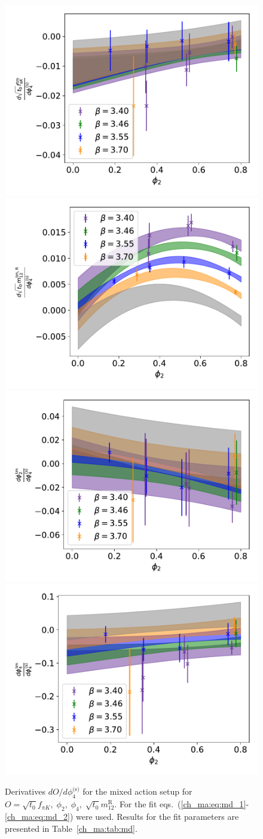 \begin{figure}
    \centering
    \includegraphics[width=.49\textwidth]{./cap4/figs/dt0fpik_tm.pdf}
    \includegraphics[width=.49\textwidth]{./cap4/figs/dt0m12_tm.pdf}
    \includegraphics[width=.49\textwidth]{./cap4/figs/dphi2_tm.pdf}
    \includegraphics[width=.49\textwidth]{./cap4/figs/dphi4_tm.pdf}
    \caption{Derivatives $dO/d\phi_4^{\textrm{(s)}}$ for the mixed action setup for $O=\sqrt{t_0}f_{\pi K},\;\phi_2,\;\phi_4,\;\sqrt{t_0}m_{12}^{\textrm{R}}$. For the fit eqs.~(\ref{ch_ma:eq:md_1}-\ref{ch_ma:eq:md_2}) were used. Results for the fit parameters are presented in Table~\ref{ch_ma:tab:md}.}
    \label{ch_ma:fig:d_tm}
\end{figure}

